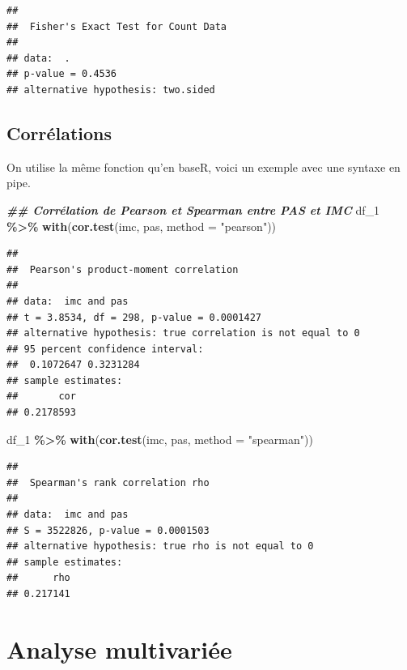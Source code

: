 \documentclass[
]{book}
\newenvironment{Shaded}{\begin{snugshade}}{\end{snugshade}}
\newcommand{\AttributeTok}[1]{\textcolor[rgb]{0.13,0.29,0.53}{#1}}
\newcommand{\DocumentationTok}[1]{\textcolor[rgb]{0.56,0.35,0.01}{\textbf{\textit{#1}}}}
\newcommand{\FunctionTok}[1]{\textcolor[rgb]{0.13,0.29,0.53}{\textbf{#1}}}
\newcommand{\NormalTok}[1]{#1}
\newcommand{\SpecialCharTok}[1]{\textcolor[rgb]{0.81,0.36,0.00}{\textbf{#1}}}
\newcommand{\StringTok}[1]{\textcolor[rgb]{0.31,0.60,0.02}{#1}}
\begin{document}
\begin{verbatim}
## 
##  Fisher's Exact Test for Count Data
## 
## data:  .
## p-value = 0.4536
## alternative hypothesis: two.sided
\end{verbatim}

\subsection{Corrélations}\label{corruxe9lations-2}

On utilise la même fonction qu'en baseR, voici un exemple avec une syntaxe en pipe.

\begin{Shaded}
\begin{Highlighting}[]
\DocumentationTok{\#\# Corrélation de Pearson et Spearman entre PAS et IMC}
\NormalTok{df\_1 }\SpecialCharTok{\%\textgreater{}\%} \FunctionTok{with}\NormalTok{(}\FunctionTok{cor.test}\NormalTok{(imc, pas, }\AttributeTok{method =} \StringTok{"pearson"}\NormalTok{))}
\end{Highlighting}
\end{Shaded}

\begin{verbatim}
## 
##  Pearson's product-moment correlation
## 
## data:  imc and pas
## t = 3.8534, df = 298, p-value = 0.0001427
## alternative hypothesis: true correlation is not equal to 0
## 95 percent confidence interval:
##  0.1072647 0.3231284
## sample estimates:
##       cor 
## 0.2178593
\end{verbatim}

\begin{Shaded}
\begin{Highlighting}[]
\NormalTok{df\_1 }\SpecialCharTok{\%\textgreater{}\%} \FunctionTok{with}\NormalTok{(}\FunctionTok{cor.test}\NormalTok{(imc, pas, }\AttributeTok{method =} \StringTok{"spearman"}\NormalTok{))}
\end{Highlighting}
\end{Shaded}

\begin{verbatim}
## 
##  Spearman's rank correlation rho
## 
## data:  imc and pas
## S = 3522826, p-value = 0.0001503
## alternative hypothesis: true rho is not equal to 0
## sample estimates:
##      rho 
## 0.217141
\end{verbatim}

\section{Analyse multivariée}\label{analyse-multivariuxe9e-2}
\end{document}
